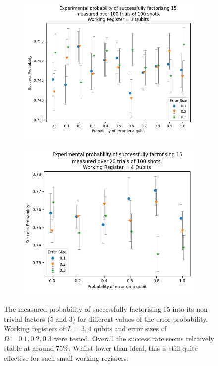 \documentclass{article}[11pt]
\begin{document}
\begin{figure}[H]
\centering
\begin{subfigure}[t]{0.65\textwidth}
\centering
\includegraphics[width=\linewidth]{Pictures/Shor Factor 15/factor 15 error test.png}
\end{subfigure}
\begin{subfigure}[t]{0.65\textwidth}
\centering
\includegraphics[width=\linewidth]{Pictures/Shor Factor 15/factor 15 error test 2.png}
\end{subfigure}
\caption{The measured probability of successfully factorising 15 into its non-trivial factors (5 and 3) for different values of the error probability. Working registers of $L=3,4$ qubits and error sizes of $\Omega=0.1,0.2,0.3$ were tested. Overall the success rate seems relatively stable at around 75\%. Whilst lower than ideal, this is still quite effective for such small working registers.}
\label{fig:factor15errors}
\end{figure}
\end{document}
